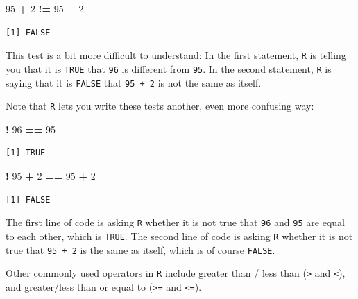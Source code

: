 \documentclass[
]{book}
\newenvironment{Shaded}{\begin{snugshade}}{\end{snugshade}}
\newcommand{\DecValTok}[1]{\textcolor[rgb]{0.00,0.00,0.81}{#1}}
\newcommand{\OperatorTok}[1]{\textcolor[rgb]{0.81,0.36,0.00}{\textbf{#1}}}
\newcommand{\StringTok}[1]{\textcolor[rgb]{0.31,0.60,0.02}{#1}}
\begin{document}
\begin{Shaded}
\begin{Highlighting}[]
\DecValTok{95} \OperatorTok{+}\StringTok{ }\DecValTok{2} \OperatorTok{!=}\StringTok{ }\DecValTok{95} \OperatorTok{+}\StringTok{ }\DecValTok{2}
\end{Highlighting}
\end{Shaded}

\begin{verbatim}
[1] FALSE
\end{verbatim}

This test is a bit more difficult to understand: In the first statement, \texttt{R} is telling you that it is \texttt{TRUE} that \texttt{96} is different from \texttt{95}. In the second statement, \texttt{R} is saying that it is \texttt{FALSE} that \texttt{95\ +\ 2} is not the same as itself.

Note that \texttt{R} lets you write these tests another, even more confusing way:

\begin{Shaded}
\begin{Highlighting}[]
\OperatorTok{!}\StringTok{ }\DecValTok{96} \OperatorTok{==}\StringTok{ }\DecValTok{95}
\end{Highlighting}
\end{Shaded}

\begin{verbatim}
[1] TRUE
\end{verbatim}

\begin{Shaded}
\begin{Highlighting}[]
\OperatorTok{!}\StringTok{ }\DecValTok{95} \OperatorTok{+}\StringTok{ }\DecValTok{2} \OperatorTok{==}\StringTok{ }\DecValTok{95} \OperatorTok{+}\StringTok{ }\DecValTok{2}
\end{Highlighting}
\end{Shaded}

\begin{verbatim}
[1] FALSE
\end{verbatim}

The first line of code is asking \texttt{R} whether it is not true that \texttt{96} and \texttt{95} are equal to each other, which is \texttt{TRUE}. The second line of code is asking \texttt{R} whether it is not true that \texttt{95\ +\ 2} is the same as itself, which is of course \texttt{FALSE}.

Other commonly used operators in \texttt{R} include greater than / less than (\texttt{\textgreater{}} and \texttt{\textless{}}), and greater/less than or equal to (\texttt{\textgreater{}=} and \texttt{\textless{}=}).
\end{document}
